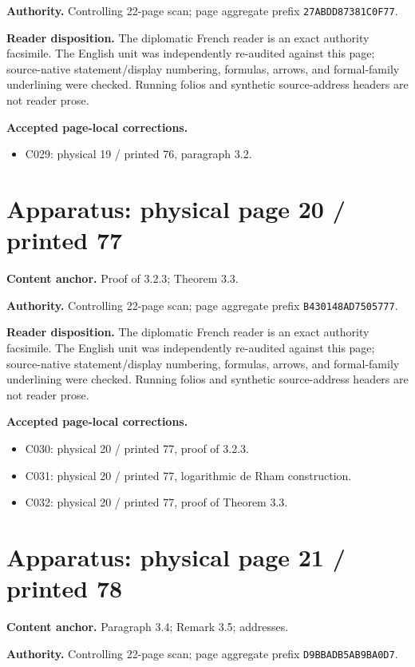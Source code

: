 \documentclass[10pt]{article}
\begin{document}
\textbf{Authority.} Controlling 22-page scan; page aggregate prefix \texttt{27ABDD87381C0F77}.

\textbf{Reader disposition.} The diplomatic French reader is an exact authority facsimile. The English unit was independently re-audited against this page; source-native statement/display numbering, formulas, arrows, and formal-family underlining were checked. Running folios and synthetic source-address headers are not reader prose.

\textbf{Accepted page-local corrections.} \begin{itemize}
\item C029: physical 19 / printed 76, paragraph 3.2.
\end{itemize}
\newpage
\setcounter{footnote}{0}
\fontsize{10.2pt}{12.04pt}\selectfont
\section*{Apparatus: physical page 20 / printed 77}
\textbf{Content anchor.} Proof of 3.2.3; Theorem 3.3.

\textbf{Authority.} Controlling 22-page scan; page aggregate prefix \texttt{B430148AD7505777}.

\textbf{Reader disposition.} The diplomatic French reader is an exact authority facsimile. The English unit was independently re-audited against this page; source-native statement/display numbering, formulas, arrows, and formal-family underlining were checked. Running folios and synthetic source-address headers are not reader prose.

\textbf{Accepted page-local corrections.} \begin{itemize}
\item C030: physical 20 / printed 77, proof of 3.2.3.
\item C031: physical 20 / printed 77, logarithmic de Rham construction.
\item C032: physical 20 / printed 77, proof of Theorem 3.3.
\end{itemize}
\newpage
\setcounter{footnote}{0}
\fontsize{10.2pt}{12.04pt}\selectfont
\section*{Apparatus: physical page 21 / printed 78}
\textbf{Content anchor.} Paragraph 3.4; Remark 3.5; addresses.

\textbf{Authority.} Controlling 22-page scan; page aggregate prefix \texttt{D9BBADB5AB9BA0D7}.
\end{document}
